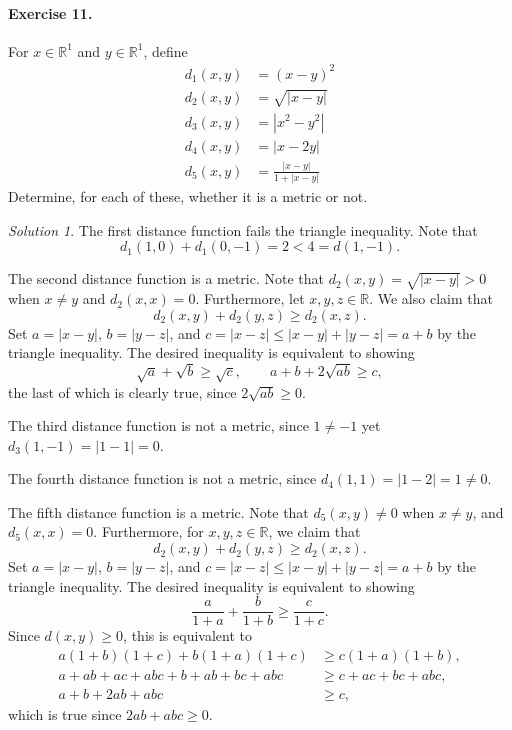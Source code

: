 \documentclass[11pt]{report}
\def\R{\mathbb{R}}
\theoremstyle{remark}
\newtheorem*{solution}{Solution}
\begin{document}
    \paragraph{Exercise 11.} For $x \in \R^1$ and $y \in \R^1$, define \begin{align*}
        d_1(x, y) &= (x - y)^2 \\
        d_2(x, y) &= \sqrt{|x - y|} \\
        d_3(x, y) &= |x^2 - y^2| \\
        d_4(x, y) &= |x - 2y| \\
        d_5(x, y) & = \frac{|x - y|}{1 + |x - y|}
    \end{align*} Determine, for each of these, whether it is a metric or not.
    \begin{solution}
        The first distance function fails the triangle inequality. Note that \[
            d_1(1, 0) + d_1(0, -1) = 2 < 4 = d(1, -1).
        \] 

        The second distance function is a metric. Note that $d_2(x, y) = \sqrt{|x -
        y|} > 0$ when $x \neq y$ and $d_2(x, x) = 0$. Furthermore, let $x, y, z \in
        \R$. We also claim that \[
            d_2(x, y) + d_2(y, z) \geq d_2(x, z).
        \] Set $a = |x - y|$, $b = |y - z|$, and $c = |x - z| \leq |x - y| + |y - z|
        = a + b$ by the triangle inequality. The desired inequality is equivalent to
        showing \[
            \sqrt{a} + \sqrt{b} \geq \sqrt{c}, \qquad a + b +  2\sqrt{ab} \geq c,
        \] the last of which is clearly true, since $2\sqrt{ab} \geq 0$.

        The third distance function is not a metric, since $1 \neq -1$ yet $d_3(1, -1)
        = |1 - 1| = 0$.

        The fourth distance function is not a metric, since $d_4(1, 1) = |1 - 2| = 1
        \neq 0$.

        The fifth distance function is a metric. Note that $d_5(x, y) \neq 0$ when
        $x \neq y$, and $d_5(x, x) = 0$. Furthermore, for $x, y, z \in \R$, we claim
        that \[
            d_2(x, y) + d_2(y, z) \geq d_2(x, z).
        \] Set $a = |x - y|$, $b = |y - z|$, and $c = |x - z| \leq |x - y| + |y - z|
        = a + b$ by the triangle inequality. The desired inequality is equivalent to
        showing \[
            \frac{a}{1 + a} + \frac{b}{1 + b} \geq \frac{c}{1 + c}.
        \] Since $d(x, y) \geq 0$, this is equivalent to \begin{align*}
            a(1 + b)(1 + c) + b(1 + a)(1 + c) &\geq c(1 + a)(1 + b), \\
            a + ab + ac + abc + b + ab + bc + abc &\geq c + ac + bc + abc, \\
            a + b + 2ab + abc &\geq c,
        \end{align*} which is true since $2ab + abc \geq 0$.
    \end{solution}
\end{document}
